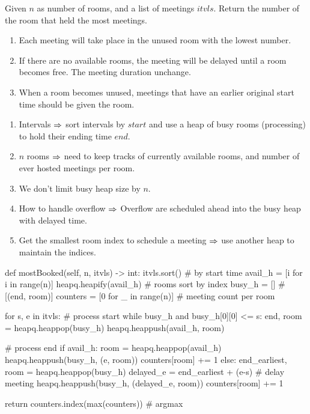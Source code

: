  Given $n$ as number of rooms, and a list of meetings $itvls$. Return the number of the room that held the most meetings. 
\begin{enumerate}
\item Each meeting will take place in the unused room with the lowest number. 
\item If there are no available rooms, the meeting will be delayed until a room becomes free. The meeting duration unchange. 
\item When a room becomes unused, meetings that have an earlier original start time should be given the room. 
\end{enumerate}
\begin{enumerate}
\item Intervals $\Rightarrow$ sort intervals by $start$ and use a heap of busy rooms (processing) to hold their ending time $end$.
\item $n$ rooms $\Rightarrow$ need to keep tracks of currently available rooms, and number of ever hosted meetings per room. 
\item We don't limit busy heap size by $n$. 
\item How to handle overflow $\Rightarrow$ Overflow are scheduled ahead into the busy heap with delayed time. 
\item Get the smallest room index to schedule a meeting $\Rightarrow$ use another heap to maintain the indices. 
\end{enumerate}
\begin{python}
def mostBooked(self, n, itvls) -> int:
    itvls.sort()  # by start time
    avail_h = [i for i in range(n)]
    heapq.heapify(avail_h)   # rooms sort by index
    busy_h = []  # [(end, room)]
    counters = [0 for _ in range(n)] # meeting count per room

    for s, e in itvls:
        # process start
        while busy_h and busy_h[0][0] <= s:
            end, room = heapq.heappop(busy_h)
            heapq.heappush(avail_h, room)
         
        # process end
        if avail_h:
            room = heapq.heappop(avail_h)
            heapq.heappush(busy_h, (e, room))
            counters[room] += 1
        else:
            end_earliest, room = heapq.heappop(busy_h)
            delayed_e = end_earliest + (e-s)  # delay meeting
            heapq.heappush(busy_h, (delayed_e, room))
            counters[room] += 1

    return counters.index(max(counters))  # argmax
    
\end{python}
